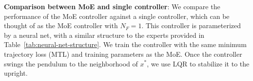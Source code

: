 %

%
\textbf{Comparison between MoE and single controller}: We compare the
performance of the MoE controller against a single controller, which can be
thought of as the MoE controller with $N_F=1$.
%
This controller is parameterized by a neural net, with a similar structure to
the experts provided in Table~\ref{tab:neural-net-structure}.
%
We train the controller with the same minimum trajectory loss (MTL) and training
parameters as the MoE.
%
Once the controller swings the pendulum to the neighborhood of $x^*$, we use LQR
to stabilize it to the upright.

